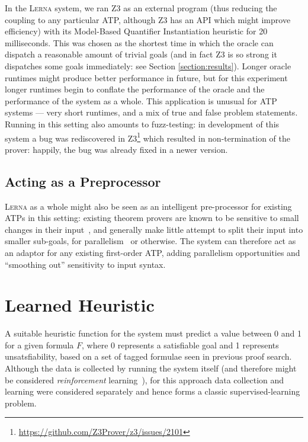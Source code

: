 \documentclass[runningheads]{llncs}
\newcommand{\lerna}{\textsc{Lerna}}
\newcommand{\z}[1]{\textsc{Z3}}
\begin{document}
In the \lerna{} system, we ran \z3{} as an external program (thus reducing the coupling to any particular ATP, although \z3{} has an API which might improve efficiency) with its Model-Based Quantifier Instantiation heuristic for 20 milliseconds.
This was chosen as the shortest time in which the oracle can dispatch a reasonable amount of trivial goals (and in fact \z3{} is so strong it dispatches some goals immediately: see Section \ref{section:results}).
Longer oracle runtimes might produce better performance in future, but for this experiment longer runtimes begin to conflate the performance of the oracle and the performance of the system as a whole.
This application is unusual for ATP systems --- very short runtimes, and a mix of true and false problem statements.
Running in this setting also amounts to fuzz-testing: in development of this system a bug was rediscovered in \z3{}\footnote{\url{https://github.com/Z3Prover/z3/issues/2101}} which resulted in non-termination of the prover: happily, the bug was already fixed in a newer version.

\subsection{Acting as a Preprocessor}
\lerna{} as a whole might also be seen as an intelligent pre-processor for existing ATPs in this setting: existing theorem provers are known to be sensitive to small changes in their input~\cite{clausification}, and generally make little attempt to split their input into smaller sub-goals, for parallelism~\cite{parallel} or otherwise.
The system can therefore act as an adaptor for any existing first-order ATP, adding parallelism opportunities and ``smoothing out'' sensitivity to input syntax.

\section{Learned Heuristic}
A suitable heuristic function for the system must predict a value between 0 and 1 for a given formula \(F\), where 0 represents a satisfiable goal and 1 represents unsatsfiability, based on a set of tagged formulae seen in previous proof search.
Although the data is collected by running the system itself (and therefore might be considered \emph{reinforcement} learning~\cite{reinforcement}), for this approach data collection and learning were considered separately and hence forms a classic supervised-learning problem.
\end{document}
